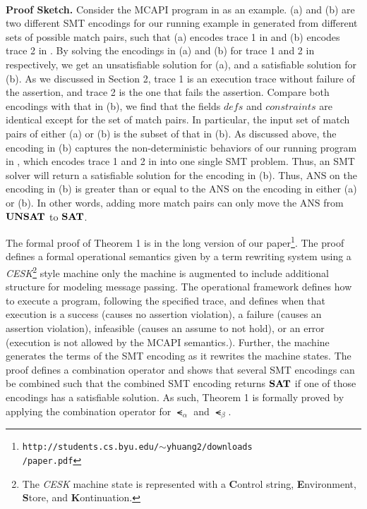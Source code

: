 \\
\textbf{Proof Sketch.}
Consider the MCAPI program in  as an example.
(a) and (b) are two different SMT encodings for our running
example in  generated from different sets of possible match pairs, such that (a) encodes trace 1 in  and (b) encodes trace 2 in . By solving the encodings in (a) and (b) for trace 1 and 2 in  respectively, we get an unsatisfiable solution for (a), and a satisfiable solution for (b). As we discussed in Section 2, trace 1 is an execution trace without failure of the assertion, and trace 2 is the one that fails the assertion. %
Compare both encodings with that in (b), we find that the fields $\mathit{defs}$ and $\mathit{constraints}$ are identical except for the set of match pairs. In particular, the input set of match pairs of either (a) or (b) is the subset of that in (b). As discussed above, the encoding in (b) captures the non-deterministic behaviors of our running program in , which encodes trace 1 and 2 in  into one single SMT problem. Thus, an SMT solver will return a satisfiable solution for the encoding in (b). Thus, $\mathrm{ANS}$ on the encoding in (b) is greater than or equal to the $\mathrm{ANS}$ on the encoding in either (a) or (b). In other words, adding more match pairs can only move the $\mathrm{ANS}$ from $\mathrm{\textbf{UNSAT}}$ to $\mathrm{\textbf{SAT}}$.

The formal proof of Theorem 1 is in the long version of our paper\footnote{\texttt{http://students.cs.byu.edu/$\sim$yhuang2/downloads\\/paper.pdf}}. The proof defines a formal operational semantics given by a term rewriting system using a \textit{CESK}\footnote{The \textit{CESK} machine state is represented with a \textbf{C}ontrol string, \textbf{E}nvironment, \textbf{S}tore, and \textbf{K}ontinuation.} style machine only the machine is augmented to include additional structure for modeling message passing. The operational framework defines how to execute a program, following the specified trace, and defines when that execution is a success (causes no assertion violation), a failure (causes an assertion violation), infeasible (causes an assume to not hold), or an error (execution is not allowed by the MCAPI semantics.). Further, the machine generates the terms of the SMT encoding as it rewrites the machine states. The proof defines a combination operator and shows that several SMT encodings can be combined such that the combined SMT encoding returns $\mathrm{\textbf{SAT}}$ if one of those encodings has a satisfiable solution.  As such, Theorem 1 is formally proved by applying the combination operator for $\smt_{\alpha}$ and $\smt_{\beta}$.

